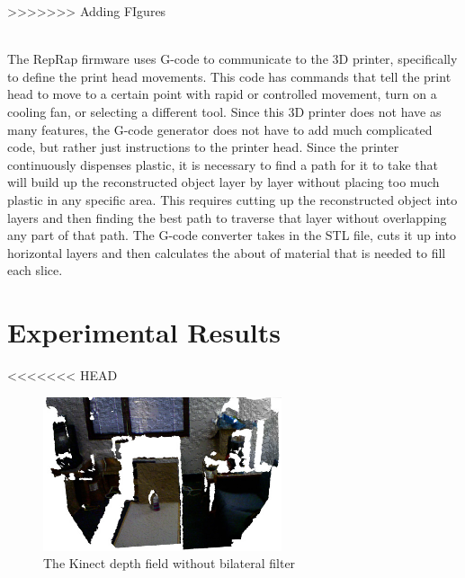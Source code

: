 \documentclass[12pt,twocolumn]{article}
\begin{document}
>>>>>>> Adding FIgures

\\ 
The RepRap firmware uses G-code to communicate to the 3D printer, specifically to define the print head movements. This code has commands that tell the print head to move to a certain point with rapid or controlled movement, turn on a cooling fan, or selecting a different tool. Since this 3D printer does not have as many features, the G-code generator does not have to add much complicated code, but rather just instructions to the printer head. Since the printer continuously dispenses plastic, it is necessary to find a path for it to take that will build up the reconstructed object layer by layer without placing too much plastic in any specific area. This requires cutting up the reconstructed object into layers and then finding the best path to traverse that layer without overlapping any part of that path. The G-code converter takes in the STL file, cuts it up into horizontal layers and then calculates the about of material that is needed to fill each slice. 



\section{Experimental Results}

<<<<<<< HEAD
\begin{figure}[ht!]
\centering
\includegraphics[width=70mm]{figures/kinectwaterbottle.jpg}
\caption{The Kinect depth field without bilateral filter}
\label{overflow}
\end{figure}

\end{document}
